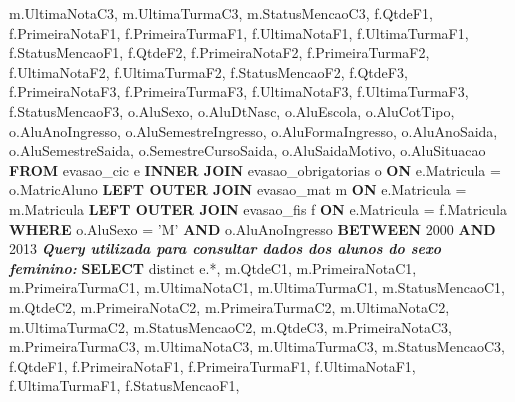m.UltimaNotaC3, m.UltimaTurmaC3, m.StatusMencaoC3, \newline
f.QtdeF1, f.PrimeiraNotaF1, f.PrimeiraTurmaF1,
f.UltimaNotaF1, f.UltimaTurmaF1, \newline 
f.StatusMencaoF1, \newline
f.QtdeF2, f.PrimeiraNotaF2, f.PrimeiraTurmaF2,
f.UltimaNotaF2, f.UltimaTurmaF2, \newline
f.StatusMencaoF2, \newline
f.QtdeF3, f.PrimeiraNotaF3, f.PrimeiraTurmaF3,
f.UltimaNotaF3, f.UltimaTurmaF3,\newline 
f.StatusMencaoF3, \newline
o.AluSexo, o.AluDtNasc, o.AluEscola, o.AluCotTipo, o.AluAnoIngresso,  \newline
o.AluSemestreIngresso, o.AluFormaIngresso, 
o.AluAnoSaida, o.AluSemestreSaida, \newline o.SemestreCursoSaida,
o.AluSaidaMotivo, o.AluSituacao \newline
\textbf{FROM} evasao\_cic e 
\textbf{INNER JOIN} evasao\_obrigatorias o \textbf{ON} e.Matricula = o.MatricAluno \newline
\textbf{LEFT OUTER JOIN} evasao\_mat m \textbf{ON} e.Matricula = m.Matricula \newline
\textbf{LEFT OUTER JOIN} evasao\_fis f \textbf{ON} e.Matricula = f.Matricula \newline
\textbf{WHERE} o.AluSexo = 'M' \textbf{AND} o.AluAnoIngresso \textbf{BETWEEN} 2000 \textbf{AND} 2013
\newline
\newline
\newline
\textbf{\textit{Query utilizada para consultar dados dos alunos do sexo feminino:}} 
\newline
\newline
\noindent \textbf{SELECT} distinct e.*, \newline
m.QtdeC1, m.PrimeiraNotaC1, m.PrimeiraTurmaC1, 
m.UltimaNotaC1, m.UltimaTurmaC1, m.StatusMencaoC1, \newline
m.QtdeC2, m.PrimeiraNotaC2, m.PrimeiraTurmaC2,
m.UltimaNotaC2, m.UltimaTurmaC2, m.StatusMencaoC2, \newline
m.QtdeC3, m.PrimeiraNotaC3, m.PrimeiraTurmaC3, 
m.UltimaNotaC3, m.UltimaTurmaC3, m.StatusMencaoC3, \newline
f.QtdeF1, f.PrimeiraNotaF1, f.PrimeiraTurmaF1,
f.UltimaNotaF1, f.UltimaTurmaF1, \newline 
f.StatusMencaoF1, \newline
